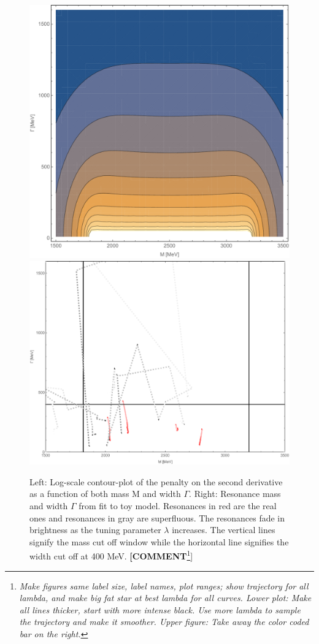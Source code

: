 \documentclass[aps, prd, twocolumn, showpacs, superscriptaddress,
preprintnumbers, nofootinbib]{revtex4-1}
\newcommand{\com}[1]{{\color{orange}\textbf{[COMMENT}\footnote{\color{orange}\textit{#1}}]}}
\begin{document}
\begin{figure}
\begin{center}
\includegraphics[width=0.99\linewidth]{Fig6A.pdf}
\includegraphics[width=0.99\linewidth]{fig6.pdf}
\caption{Left: Log-scale contour-plot of the penalty on the second derivative as a function of both mass M and width $\Gamma$. Right: Resonance mass and width $\Gamma$ from fit to toy model. Resonances in red are the real ones and resonances in gray are superfluous. The resonances fade in brightness as the tuning parameter $\lambda$ increases. The vertical lines signify the mass cut off window while the horizontal line signifies the width cut off at 400 MeV.
\com{Make figures same label size, label names, plot ranges; show trajectory for all lambda, and make big fat star at best lambda for all curves. Lower plot: Make all lines thicker, start with more intense black. Use more lambda to sample the trajectory and make it smoother. Upper figure: Take away the color coded bar on the right.}
}
\label{fig:Fig6}
\end{center}
\end{figure}
\end{document}
